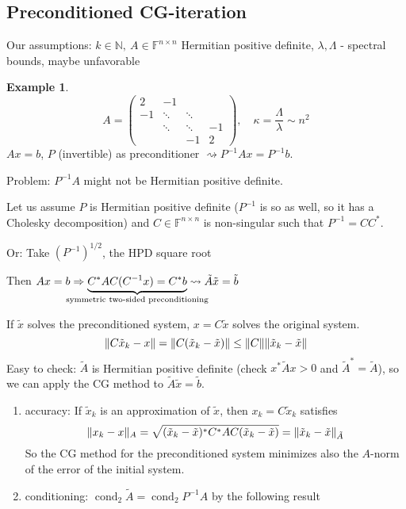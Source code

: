 \documentclass[12pt]{article}
\theoremstyle{definition}
\newtheorem*{example*}{Example}
\theoremstyle{remark}
\numberwithin{equation}{section}
\newcommand{\F}{\mathbb{F}}
\newcommand{\N}{\mathbb{N}}
\DeclarePairedDelimiter{\norm}{\lVert}{\rVert}
\DeclareMathOperator{\cond}{cond}
\begin{document}
\subsection*{Preconditioned CG-iteration}
Our assumptions: $k \in \N,\ A \in \F^{n\times n}$ Hermitian positive definite, $\lambda,\Lambda$ - spectral bounds, maybe unfavorable
\begin{example*}
  \begin{equation*}
    A =
    \begin{pmatrix}
      2  & -1 &&\\
      -1 & \ddots & \ddots & \\
      & \ddots & \ddots &-1 \\
      & & -1 & 2
    \end{pmatrix}
    ,\quad \kappa = \frac{\Lambda}{\lambda} \sim n^2
  \end{equation*}
  $Ax = b$, $P$ (invertible) as preconditioner $\rightsquigarrow P^{-1} A x = P^{-1} b$.

  Problem: $P^{-1} A$ might not be Hermitian positive definite.

  Let us assume $P$ is Hermitian positive definite ($P^{-1}$ is so as well, so it has a Cholesky decomposition) and $C \in \F^{n\times n}$ is non-singular such that $P^{-1} = CC^*$.

  Or: Take $(P^{-1})^{1/2}$, the HPD square root

  Then $Ax = b \Rightarrow \underbrace{C^* A C (C^{-1} x) = C^* b}_{\mathclap{\text{symmetric two-sided preconditioning}}} \rightsquigarrow \tilde{A} \tilde{x} = \tilde{b}$

  If $\tilde{x}$ solves the preconditioned system, $x = C \tilde{x}$ solves the original system.
  \begin{equation*}
    \norm{C \tilde{x}_k - x} = \norm{C(\tilde{x}_k - \tilde{x})} \leq \norm{C} \norm{\tilde{x}_k - \tilde{x}}
  \end{equation*}
  Easy to check: $\tilde{A}$ is Hermitian positive definite (check $x^*\tilde{A}x > 0$ and $\tilde{A}^* = \tilde{A}$), so we can apply the CG method to $\tilde{A} \tilde{x} = \tilde{b}$.
  \begin{enumerate}[label=(\roman*)]
    \item accuracy: If $\tilde{x}_k$ is an approximation of $\tilde{x}$, then $x_k = C \tilde{x}_k$ satisfies
      \begin{equation*}
        \norm{x_k - x}_A = \sqrt{(\tilde{x}_k - \tilde{x})^* C^* A C (\tilde{x}_k - \tilde{x})} = \norm{\tilde{x}_k - \tilde{x}}_{\tilde{A}}
      \end{equation*}
      So the CG method for the preconditioned system minimizes also the $A$-norm of the error of the initial system.
    \item conditioning: $\cond_2 \tilde{A} = \cond_2 P^{-1} A$ by the following result
  \end{enumerate}
\end{example*}
\end{document}
